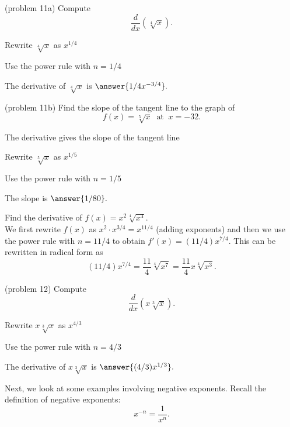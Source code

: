 \documentclass{ximera}
\begin{document}
\begin{problem}(problem 11a)
Compute
\[
\frac{d}{dx} \left(\sqrt[4] x\right).
\]
\begin{hint}
Rewrite $\sqrt[4] x$ as $x^{1/4}$
\end{hint}
\begin{hint}
Use the power rule with $n = 1/4$
\end{hint}
The derivative of $\sqrt[4] x$ is $\answer{1/4 x^{-3/4}}.$
\end{problem}



\begin{problem}(problem 11b)
Find the slope of the tangent line to the graph of 
\[
f(x) = \sqrt[5] x  \;\; \text{at} \;\; x = -32.
\]

\begin{hint}
The derivative gives the slope of the tangent line
\end{hint}
\begin{hint}
Rewrite $\sqrt[5] x$ as $x^{1/5}$
\end{hint}
\begin{hint}
Use the power rule with $n = 1/5$
\end{hint}
The slope is  $\answer{1/80}.$
\end{problem}



\begin{example}[example 12]
Find the derivative of $f(x) = x^2\sqrt[4] {x^3}$.\\
We first rewrite $f(x)$ 
as $x^2 \cdot x^{3/4} = x^{11/4}$ (adding exponents) and then we use the power rule with $n = 11/4$
to obtain $f'(x) = (11/4)x^{7/4}$. This can be rewritten in radical form as 
\[(11/4)x^{7/4}  = \frac{11}{4} \sqrt[4] {x^7} = \frac{11}{4} x\sqrt[4] {x^3} .\]
\end{example}



\begin{problem}(problem 12)
Compute
\[
\frac{d}{dx} \left(x\sqrt[3] x\right).
\]
\begin{hint}
Rewrite $x\sqrt[3] x$ as $x^{4/3}$
\end{hint}
\begin{hint}
Use the power rule with $n = 4/3$
\end{hint}
The derivative of $x\sqrt[3] x$ is $\answer{(4/3) x^{1/3}}.$
\end{problem}



Next, we look at some examples involving negative exponents. Recall the definition of negative exponents:
\[
x^{-n} = \frac{1}{x^n}.
\]
\end{document}
